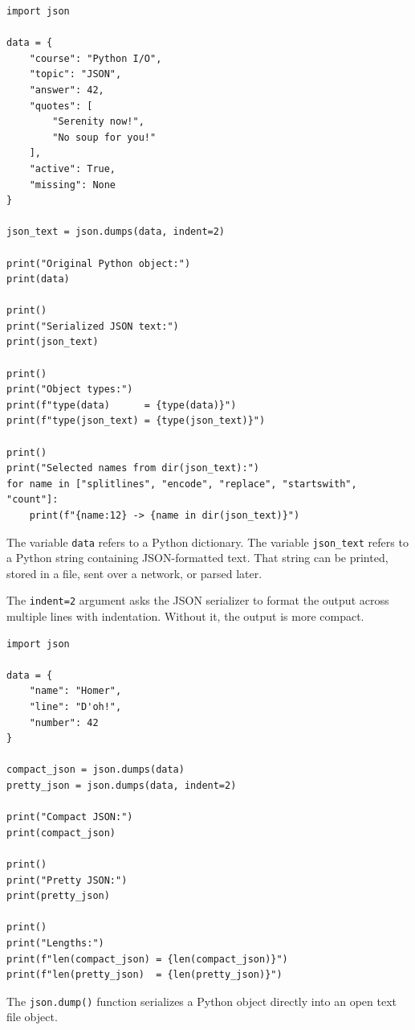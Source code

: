 \begin{verbatim}
import json

data = {
    "course": "Python I/O",
    "topic": "JSON",
    "answer": 42,
    "quotes": [
        "Serenity now!",
        "No soup for you!"
    ],
    "active": True,
    "missing": None
}

json_text = json.dumps(data, indent=2)

print("Original Python object:")
print(data)

print()
print("Serialized JSON text:")
print(json_text)

print()
print("Object types:")
print(f"type(data)      = {type(data)}")
print(f"type(json_text) = {type(json_text)}")

print()
print("Selected names from dir(json_text):")
for name in ["splitlines", "encode", "replace", "startswith", "count"]:
    print(f"{name:12} -> {name in dir(json_text)}")
\end{verbatim}

The variable \texttt{data} refers to a Python dictionary. The variable \texttt{json\_text} refers to a Python string containing JSON-formatted text. That string can be printed, stored in a file, sent over a network, or parsed later.

The \texttt{indent=2} argument asks the JSON serializer to format the output across multiple lines with indentation. Without it, the output is more compact.

\begin{verbatim}
import json

data = {
    "name": "Homer",
    "line": "D'oh!",
    "number": 42
}

compact_json = json.dumps(data)
pretty_json = json.dumps(data, indent=2)

print("Compact JSON:")
print(compact_json)

print()
print("Pretty JSON:")
print(pretty_json)

print()
print("Lengths:")
print(f"len(compact_json) = {len(compact_json)}")
print(f"len(pretty_json)  = {len(pretty_json)}")
\end{verbatim}

The \texttt{json.dump()} function serializes a Python object directly into an open text file object.


